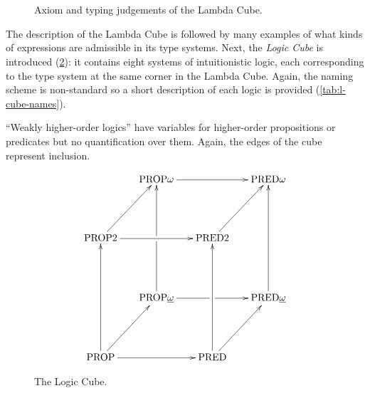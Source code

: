\documentclass[12pt,toc=bibliography,numbers=noendperiod,
               footnotes=multiple,twoside]{scrartcl}
\begin{document}
\begin{figure}[h]
    \\
    \vspace{10pt}
    \begin{minipage}[b]{.5\linewidth}
        \begin{prooftree}
        \end{prooftree}
    \end{minipage}
    \\
    \vspace{10pt}
    \begin{minipage}[b]{.5\linewidth}
        \begin{prooftree}
        \end{prooftree}
    \end{minipage}
    \caption{Axiom and typing judgements of the Lambda Cube.}
    \label{fig:lambda-cube-typing}
\end{figure}


The description of the Lambda Cube is followed by many examples of what kinds of expressions are admissible in its type systems. Next, the \emph{Logic Cube} is introduced (\cref{fig:l-cube}): it contains eight systems of intuitionistic logic, each corresponding to the type system at the same corner in the Lambda Cube. Again, the naming scheme is non-standard so a short description of each logic is provided (\cref{tab:l-cube-names}).

\enquote{Weakly higher-order logics} have variables for higher-order propositions or predicates but no quantification over them. Again, the edges of the cube represent inclusion.

\begin{figure}[h]
\begin{equation*}
\xymatrix@R46pt@C16pt{%
&\textrm{PROP}\omega\ar@{->}[rr]&&\textrm{PRED}\omega \\
\textrm{PROP2}\ar@{->}[rr]\ar@{->}[ur]&&\textrm{PRED2}\ar@{->}[ur] \\
&\textrm{PROP}\underline{\omega}\ar@{->}[uu]|!{"2,1";"2,3"}\hole\ar@{->}[rr]|!{"4,3";"2,3"}\hole&&\textrm{PRED}\underline{\omega}\ar@{->}[uu] \\
\textrm{PROP}\ar@{->}[uu]\ar@{->}[rr]\ar@{->}[ur]&&\textrm{PRED}\ar@{->}[uu]\ar@{->}[ur]
}
\end{equation*}
\caption{The Logic Cube.}
\label{fig:l-cube}
\end{figure}
\end{document}
